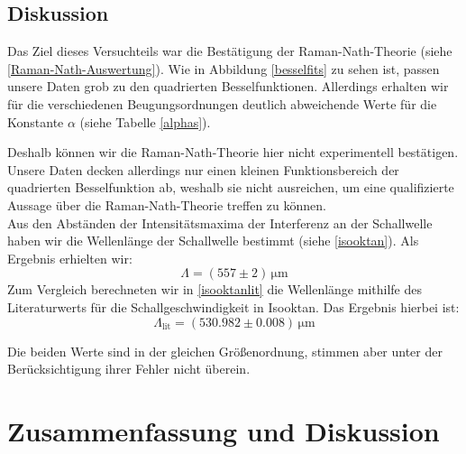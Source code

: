 \documentclass[12pt]{article}
\begin{document}
\subsection{Diskussion}
Das Ziel dieses Versuchteils war die Bestätigung der Raman-Nath-Theorie (siehe \ref{Raman-Nath-Auswertung}). Wie in Abbildung \ref{besselfits} zu sehen ist, passen unsere Daten grob zu den quadrierten Besselfunktionen. Allerdings erhalten wir für die verschiedenen Beugungsordnungen deutlich abweichende Werte für die Konstante $\alpha$ (siehe Tabelle \ref{alphas}). 
\begin{table}[h!]
\end{table}

Deshalb können wir die Raman-Nath-Theorie hier nicht experimentell bestätigen. Unsere Daten decken allerdings nur einen kleinen Funktionsbereich der quadrierten Besselfunktion ab, weshalb sie nicht ausreichen, um eine qualifizierte Aussage über die Raman-Nath-Theorie treffen zu können.\\

Aus den Abständen der Intensitätsmaxima der Interferenz an der Schallwelle haben wir die Wellenlänge der Schallwelle bestimmt (siehe \ref{isooktan}). Als Ergebnis erhielten wir: $$\Lambda=(557\pm2)\,\mathrm{\mu m}$$ Zum Vergleich berechneten wir in \ref{isooktanlit} die Wellenlänge mithilfe des Literaturwerts für die Schallgeschwindigkeit in Isooktan. Das Ergebnis hierbei ist: $$\Lambda_{\mathrm{lit}}=(530.982\pm0.008)\,\mathrm{\mu m}$$

Die beiden Werte sind in der gleichen Größenordnung, stimmen aber unter der Berücksichtigung ihrer Fehler nicht überein.

\newpage
\section{Zusammenfassung und Diskussion}
\end{document}
